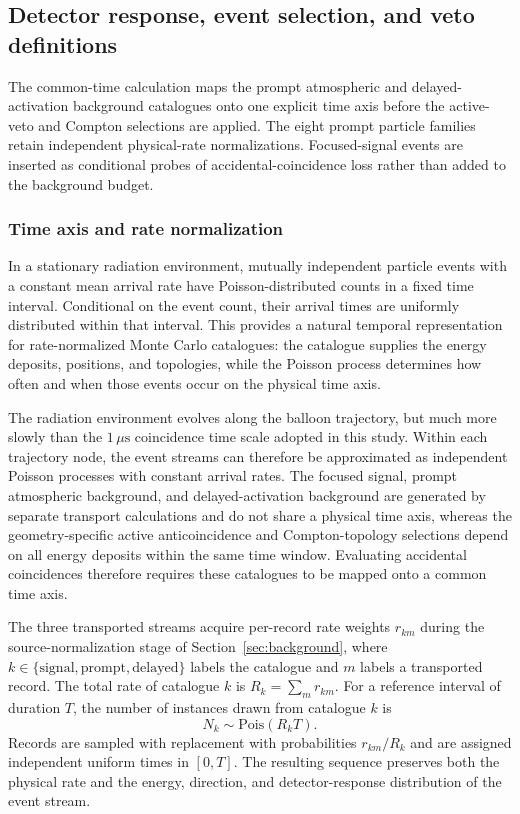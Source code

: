 \documentclass[11pt]{article}
\newcommand{\revblue}[1]{\textcolor{revisionblue}{#1}}
\begin{document}
\subsection{Detector response, event selection, and veto definitions}
\label{sec:selection}

The common-time calculation maps the prompt atmospheric and delayed-activation
background catalogues onto one explicit time axis before the active-veto and
Compton selections are applied. \revblue{The eight prompt particle families
retain independent physical-rate normalizations}. Focused-signal events are inserted as
conditional probes of accidental-coincidence loss rather than added to the
background budget.

\subsubsection{Time axis and rate normalization}
\label{subsec:time_axis}

In a stationary radiation environment, mutually independent particle events
with a constant mean arrival rate have Poisson-distributed counts in a fixed
time interval. Conditional on the event count, their arrival times are
uniformly distributed within that interval. This provides a natural temporal
representation for rate-normalized Monte Carlo catalogues: the catalogue
supplies the energy deposits, positions, and topologies, while the Poisson
process determines how often and when those events occur on the physical time
axis.

The radiation environment evolves along the balloon trajectory, but much more
slowly than the $1\,\mu\mathrm{s}$ coincidence time scale adopted in this study.
Within each trajectory node, the event streams can therefore be approximated as
independent Poisson processes with constant arrival rates. The focused signal,
prompt atmospheric background, and delayed-activation background are generated
by separate transport calculations and do not share a physical time axis,
whereas the geometry-specific active anticoincidence and Compton-topology selections depend on all
energy deposits within the same time window. Evaluating accidental coincidences
therefore requires these catalogues to be mapped onto a common time axis.

The three transported streams acquire per-record rate weights $r_{km}$ during
the source-normalization stage of Section~\ref{sec:background}, where
$k\in\{\mathrm{signal},\mathrm{prompt},\mathrm{delayed}\}$ labels the catalogue
and $m$ labels a transported record. The total rate of catalogue $k$ is
$R_k=\sum_m r_{km}$. For a reference interval of duration $T$, the number of
instances drawn from catalogue $k$ is
\begin{equation}
 N_k\sim\mathrm{Pois}(R_kT).
 \label{eq:poisson_superposition}
\end{equation}
Records are sampled with replacement with probabilities $r_{km}/R_k$ and are
assigned independent uniform times in $[0,T]$. The resulting sequence preserves
both the physical rate and the energy, direction, and detector-response
distribution of the event stream.
\end{document}
